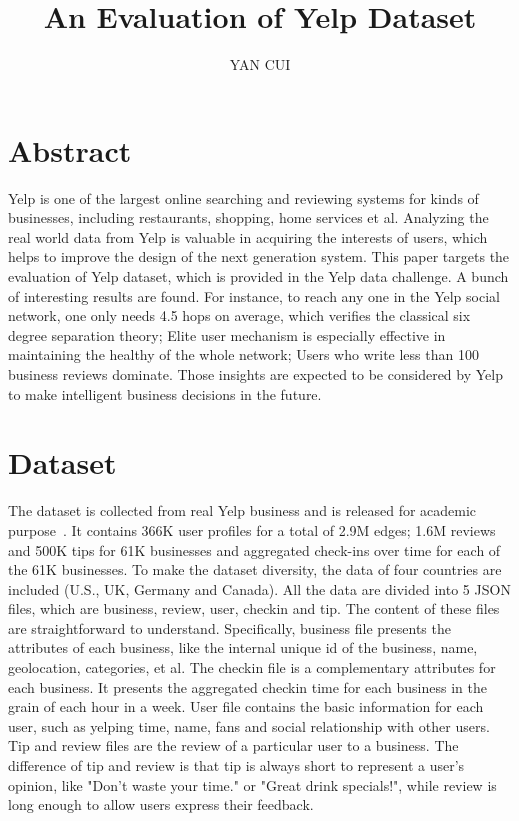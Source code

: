\documentclass[10pt]{sig-alternate-10pt}   	%
\title{An Evaluation of Yelp Dataset}
\author{YAN CUI}
\affil{Columbia University}
\begin{document}
\maketitle
\section{Abstract}
Yelp is one of the largest online searching and reviewing systems for kinds of businesses, including restaurants, shopping, 
home services et al.  Analyzing the real world data from Yelp is valuable in acquiring the interests of users, which helps to 
improve the design of the next generation system. This paper targets the evaluation of Yelp dataset, which is provided in
the Yelp data challenge. A bunch of interesting results are found. For instance, to reach any one in the Yelp social network, 
one only needs 4.5 hops on average, which verifies the classical six degree separation theory; 
Elite user mechanism is especially effective in maintaining the healthy of the whole network; Users who write less than 
100 business reviews dominate. Those insights are expected to be considered by Yelp to make intelligent 
business decisions in the future. 
   
\section{Dataset}
The dataset is collected from real Yelp business and is released for academic purpose~\cite{dataset}.  It contains 366K user 
profiles for a total of 2.9M edges; 1.6M reviews and 500K tips for 61K businesses and aggregated check-ins over time for 
each of the 61K businesses. To make the dataset diversity, the data of four countries are included (U.S., UK, Germany and 
Canada). All the data are divided into 5 JSON files, which are business, review, user, checkin and tip. The content of these files 
are straightforward to understand. Specifically, business file presents the attributes of each business, like the internal unique id of the 
business, name, geolocation, categories, et al. The checkin file is a complementary attributes for each business. It presents
the aggregated checkin time for each business in the grain of each hour in a week. User file contains the basic information for 
each user, such as yelping time, name, fans and social relationship with other users. Tip and review files are the review of a 
particular user to a business. The difference of tip and review is that tip is always short to represent a user's opinion, like 
"Don't waste your time." or "Great drink specials!", while review is long enough to allow users express their feedback.
\end{document}
